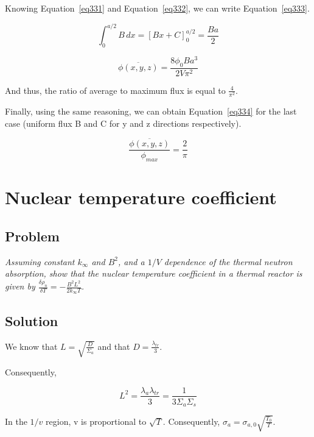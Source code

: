 Knowing Equation~\ref{eq331} and Equation~\ref{eq332}, we can write Equation~\ref{eq333}.

\begin{equation}\label{eq332}
\int_0^{a/2} B \,dx = \left[ Bx + C \right]_0^{a/2} = \frac{Ba}{2}
\end{equation}

\begin{equation}\label{eq333}
\overline{\phi(x,y,z)} = \frac{8 \phi_0 B a^3}{2 V\pi^2} 
\end{equation}

And thus, the ratio of average to maximum flux is equal to $\frac{4}{ \pi^2}$.

Finally, using the same reasoning, we can obtain Equation~\ref{eq334} for the last case (uniform flux B and C for y and z directions respectively).

\begin{equation}\label{eq333}
\frac{\overline{\phi(x,y,z)}}{\phi_{max}} = \frac{2}{\pi} 
\end{equation}

\section{Nuclear temperature coefficient}
\label{prob35}

\subsection{Problem}
\textit{Assuming constant $k_{\infty}$ and $B^2$, and a $1/V$ dependence of the thermal neutron absorption, show that the nuclear temperature coefficient in a thermal reactor is given by $\frac{\delta\rho_n}{\delta T} = - \frac{B^2 L^2}{2k_{\infty}T}$.}

\subsection{Solution}

We know that $L=\sqrt{\frac{D}{\Sigma_a}}$ and that $D = \frac{\lambda_{tr}}{3}$.

Consequently,

\begin{equation}\label{eq320}
L^2 = \frac{\lambda_a\lambda_{tr}}{3} = \frac{1}{3\Sigma_a\Sigma_s}
\end{equation}

In the $1/v$ region, v is proportional to $\sqrt{T}$. Consequently, $\sigma_a = \sigma_{a,0}\sqrt{\frac{T_0}{T}}$.

